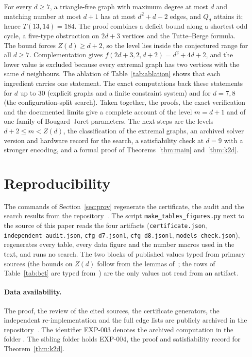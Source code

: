 \documentclass[11pt]{article}
\theoremstyle{remark}
\begin{document}
For every $d\ge7$, a triangle-free graph with maximum degree at most $d$ and matching number at most $d+1$ has at most $d^2+d+2$ edges, and $Q_d$ attains it; hence $T(13,14)=184$. The proof combines a deficit bound along a shortest odd cycle, a five-type obstruction on $2d+3$ vertices and the Tutte--Berge formula. The bound forces $Z(d)\ge d+2$, so the level lies inside the conjectured range for all $d\ge7$. Complementation gives $f(2d+3,2,d+2)=d^2+4d+2$, and the lower value is excluded because every extremal graph has two vertices with the same $d$ neighbours. The ablation of Table~\ref{tab:ablation} shows that each ingredient carries one statement. The exact computations back these statements for $d$ up to $30$ (explicit graphs and a finite constraint system) and for $d=7,8$ (the configuration-split search). Taken together, the proofs, the exact verification and the documented limits give a complete account of the level $m=d+1$ and of one family of Bougard--Joret parameters. The next steps are the levels $d+2\le m<Z(d)$, the classification of the extremal graphs, an archived solver version and hardware record for the search, a satisfiability check at $d=9$ with a stronger encoding, and a formal proof of Theorems~\ref{thm:main} and~\ref{thm:k2d}.

\section{Reproducibility}\label{sec:repro}

The commands of Section~\ref{sec:prov} regenerate the certificate, the audit and the search results from the repository~\cite{Record,Record4}. The script \texttt{make\_tables\_figures.py} next to the source of this paper reads the four artifacts (\texttt{certificate.json}, \texttt{independent-audit.json}, \texttt{cfg-d7.jsonl}, \texttt{cfg-d8.jsonl}, \texttt{models-check.json}), regenerates every table, every data figure and the number macros used in the text, and runs no search. The two blocks of published values typed from primary sources (the bounds on $Z(d)$ follow from the lemmas of~\cite{AEY}; the rows of Table~\ref{tab:bet} are typed from~\cite{BET}) are the only values not read from an artifact.

\paragraph{Data availability.}
The proof, the review of the cited sources, the certificate generators, the independent re-implementation and the full edge lists are publicly archived in the repository~\cite{Record}. The identifier EXP-003 denotes the archived computation in the folder . The sibling folder  holds EXP-004, the proof and satisfiability record for Theorem~\ref{thm:k2d}.
\end{document}
